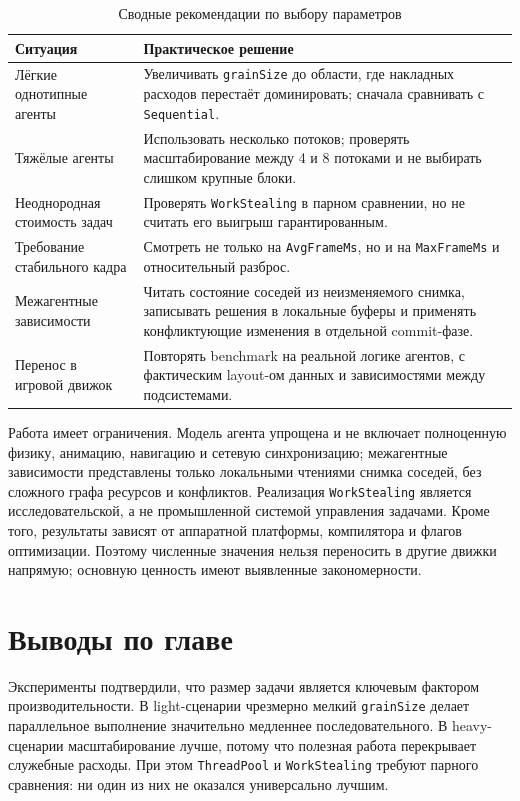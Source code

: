 \documentclass[14pt,a4paper,oneside]{extreport}
\begin{document}
\begin{table}[ht]
\centering
\small
\caption{Сводные рекомендации по выбору параметров}
\label{tab:recommendations}
\begin{tabularx}{\textwidth}{|p{}|X|}
\hline
Ситуация & Практическое решение \\
\hline
Лёгкие однотипные агенты & Увеличивать \texttt{grainSize} до области, где накладных расходов перестаёт доминировать; сначала сравнивать с \texttt{Sequential}. \\
\hline
Тяжёлые агенты & Использовать несколько потоков; проверять масштабирование между 4 и 8 потоками и не выбирать слишком крупные блоки. \\
\hline
Неоднородная стоимость задач & Проверять \texttt{WorkStealing} в парном сравнении, но не считать его выигрыш гарантированным. \\
\hline
Требование стабильного кадра & Смотреть не только на \texttt{AvgFrameMs}, но и на \texttt{MaxFrameMs} и относительный разброс. \\
\hline
Межагентные зависимости & Читать состояние соседей из неизменяемого снимка, записывать решения в локальные буферы и применять конфликтующие изменения в отдельной commit-фазе. \\
\hline
Перенос в игровой движок & Повторять benchmark на реальной логике агентов, с фактическим layout-ом данных и зависимостями между подсистемами. \\
\hline
\end{tabularx}
\end{table}

Работа имеет ограничения. Модель агента упрощена и не включает полноценную физику, анимацию, навигацию и сетевую синхронизацию; межагентные зависимости представлены только локальными чтениями снимка соседей, без сложного графа ресурсов и конфликтов. Реализация \texttt{WorkStealing} является исследовательской, а не промышленной системой управления задачами. Кроме того, результаты зависят от аппаратной платформы, компилятора и флагов оптимизации. Поэтому численные значения нельзя переносить в другие движки напрямую; основную ценность имеют выявленные закономерности.

\section{Выводы по главе}

Эксперименты подтвердили, что размер задачи является ключевым фактором производительности. В light-сценарии чрезмерно мелкий \texttt{grainSize} делает параллельное выполнение значительно медленнее последовательного. В heavy-сценарии масштабирование лучше, потому что полезная работа перекрывает служебные расходы. При этом \texttt{ThreadPool} и \texttt{WorkStealing} требуют парного сравнения: ни один из них не оказался универсально лучшим.
\end{document}
